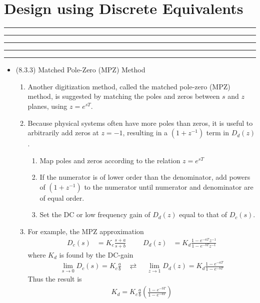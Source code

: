 \setcounter{chapter}{7}
\setcounter{section}{2}
\section{Design using Discrete Equivalents}
\vspace{-8pt} \hrule \hrule \hrule \hrule \hrule  \vspace{12pt}
\begin{itemize}
	\item (8.3.3) Matched Pole-Zero (MPZ) Method 
	\begin{enumerate}
		\item Another digitization method, called the matched pole-zero (MPZ) method, is suggested by matching the poles and zeros between $s$ and $z$ planes, using $z = e^{sT}$. 
		\item Because physical systems often have more poles than zeros, it is useful to arbitrarily add zeros at $z=-1$, resulting in a $(1+z^{-1})$ term in $D_d(z)$.
		\begin{enumerate}
			\item Map poles and zeros according to the relation $z = e^{sT}$
			\item If the numerator is of lower order than the denominator, add powers of $(1+z^{-1})$ to the numerator until numerator and denominator are of equal order.
			\item Set the DC or low frequency gain of $D_d(z)$ equal to that of $D_c(s)$.
		\end{enumerate}
		\item For example, the MPZ approximation  
		\begin{align*}
			D_c(s) &= K_c \frac{s+a}{s+b} &&& D_d(z) &= K_d \frac{1-e^{-aT}z^{-1}}{1-e^{-bT}z^{-1}}
		\end{align*}
		where $K_d$ is found by the DC-gain 
		\begin{align*}
			\lim_{s \rightarrow 0} D_c(s) = K_c \frac{a}{b} ~~~~\rightleftarrows~~~~~ 
			\lim_{z \rightarrow 1} D_d(z) = K_d \frac{1-e^{-aT}}{1-e^{-bT}} 
		\end{align*} 
		Thus the result is
		\begin{align*}
			K_d = K_c \frac{a}{b} \left( \frac{1-e^{-bT}}{1-e^{-aT}} \right) 
		\end{align*}
	\end{enumerate}

\end{itemize}		